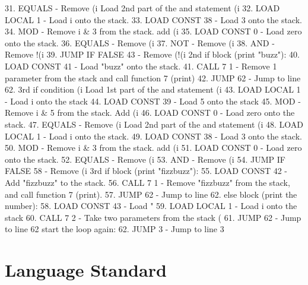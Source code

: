 \documentclass[12pt, letterpaper, oneside]{article}
\begin{document}
{\begin{spverbatim}
			31. EQUALS - Remove (i %
			Load 2nd part of the and statement (i %
			32. LOAD LOCAL 1 - Load i onto the stack.
			33. LOAD CONST 38 - Load 3 onto the stack.
			34. MOD - Remove i & 3 from the stack. add (i %
			35. LOAD CONST 0 - Load zero onto the stack.
			36. EQUALS - Remove (i %
			37. NOT - Remove (i %
			38. AND - Remove !(i %
			39. JUMP IF FALSE 43 - Remove (!(i %
			2nd if block (print "buzz"):
			40. LOAD CONST 41 - Load "buzz" onto the stack.
			41. CALL 7 1 - Remove 1 parameter from the stack and call function 7 (print)
			42. JUMP 62 - Jump to line 62.
			3rd if condition (i %
			Load 1st part of the and statement (i %
			43. LOAD LOCAL 1 - Load i onto the stack
			44. LOAD CONST 39 - Load 5 onto the stack
			45. MOD - Remove i & 5 from the stack. Add (i %
			46. LOAD CONST 0 - Load zero onto the stack.
			47. EQUALS - Remove (i %
			Load 2nd part of the and statement (i %
			48. LOAD LOCAL 1 - Load i onto the stack.
			49. LOAD CONST 38 - Load 3 onto the stack.
			50. MOD - Remove i & 3 from the stack. add (i %
			51. LOAD CONST 0 - Load zero onto the stack.
			52. EQUALS - Remove (i %
			53. AND - Remove (i %
			54. JUMP IF FALSE 58 - Remove (i %
			3rd if block (print "fizzbuzz"):
			55. LOAD CONST 42 - Add "fizzbuzz" to the stack.
			56. CALL 7 1 - Remove "fizzbuzz" from the stack, and call function 7 (print).
			57. JUMP 62 - Jump to line 62.
			else block (print the number):
			58. LOAD CONST 43 - Load "%
			59. LOAD LOCAL 1 - Load i onto the stack
			60. CALL 7 2 - Take two parameters from the stack (%
			61. JUMP 62 - Jump to line 62
			start the loop again:
			62. JUMP 3 - Jump to line 3
		\end{spverbatim} \normalsize}
	\newpage
	\renewcommand{\thepage}{\arabic{page}}
	\section{Language Standard}
\end{document}
